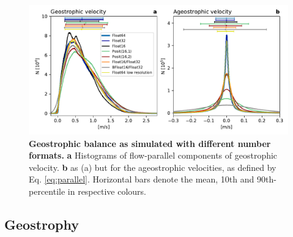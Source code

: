 \begin{figure}
\includegraphics[width=1\textwidth]{Figures/swm/ageostrophic.pdf}
\caption{\textbf{Geostrophic balance as simulated with different number formats.}
\textbf{a} Histograms of flow-parallel components of geostrophic velocity. \textbf{b} as (a) but for the ageostrophic velocities, as
defined by Eq. \ref{eq:parallel}. Horizontal bars denote the mean, 10th and 90th-percentile in respective colours.}
\label{fig:geo}
\end{figure}

\subsection{Geostrophy}

